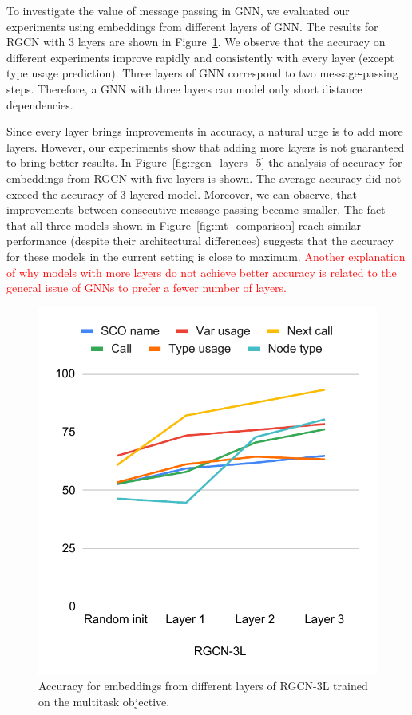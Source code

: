 \documentclass[a4paper,twoside]{article}
\begin{document}
To investigate the value of message passing in GNN, we evaluated our experiments using embeddings from different layers of GNN\@. The results for RGCN with 3 layers are shown in Figure~\ref{fig:rgcn_layers_3}. We observe that the accuracy on different experiments improve rapidly and consistently with every layer (except type usage prediction). Three layers of GNN correspond to two message-passing steps. Therefore, a GNN with three layers can model only short distance dependencies.

Since every layer brings improvements in accuracy, a natural urge is to add more layers. However, our experiments show that adding more layers is not guaranteed to bring better results. In Figure~\ref{fig:rgcn_layers_5} the analysis of accuracy for embeddings from RGCN with five layers is shown. The average accuracy did not exceed the accuracy of 3-layered model. Moreover, we can observe, that improvements between consecutive message passing became smaller. The fact that all three models shown in Figure~\ref{fig:mt_comparison} reach similar performance (despite their architectural differences) suggests that the accuracy for these models in the current setting is close to maximum. \textcolor{red}{Another explanation of why models with more layers do not achieve better accuracy is related to the general issue of GNNs to prefer a fewer number of layers.}

\begin{figure}[]
    \centering
    \includegraphics[width=\columnwidth]{rgcn-3l.pdf}
    \caption{Accuracy for embeddings from different layers of RGCN-3L trained on the multitask objective.}\label{fig:rgcn_layers_3}
\end{figure}
\end{document}
